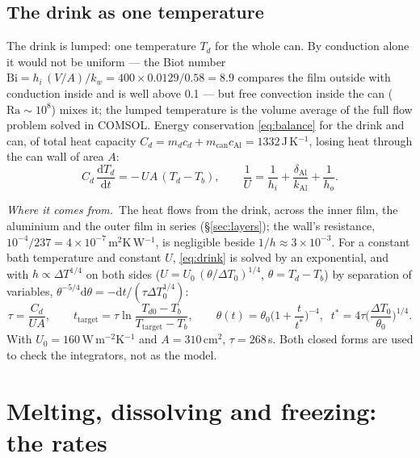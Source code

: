 \documentclass[11pt,a4paper]{article}
\newcommand{\where}{\par\noindent\textit{Where it comes from.}\ }
\begin{document}
\subsection{The drink as one temperature}
\label{sec:lump}
The drink is lumped: one temperature $T_d$ for the whole can. By conduction alone it would not be
uniform — the Biot number $\mathrm{Bi} = h_i\,(V/A)/k_w = 400 \times 0.0129/0.58 = 8.9$ compares the
film outside with conduction inside and is well above 0.1 — but free convection inside the can
($\mathrm{Ra} \sim 10^8$) mixes it; the lumped temperature is the volume average of the full flow
problem solved in COMSOL. Energy conservation \eqref{eq:balance} for the drink and can, of total heat
capacity $C_d = m_d c_d + m_{\text{can}} c_{\text{Al}} = 1332$\,J\,K$^{-1}$, losing heat through the can
wall of area $A$:
\begin{equation}
C_d\,\frac{\mathrm dT_d}{\mathrm dt} = -\,U A\,(T_d - T_b),
\qquad \frac{1}{U} = \frac{1}{h_i} + \frac{\delta_{\text{Al}}}{k_{\text{Al}}} + \frac{1}{h_o} .
\label{eq:drink}
\end{equation}
\where The heat flows from the drink, across the inner film, the aluminium and the outer film in
series (§\ref{sec:layers}); the wall's resistance, $10^{-4}/237 = 4\times10^{-7}$\,m$^2$K\,W$^{-1}$, is
negligible beside $1/h \approx 3\times10^{-3}$. For a constant bath temperature and constant $U$,
\eqref{eq:drink} is solved by an exponential, and with $h \propto \Delta T^{1/4}$ on both sides
($U = U_0\,(\theta/\Delta T_0)^{1/4}$, $\theta = T_d - T_b$) by separation of variables,
$\theta^{-5/4}\mathrm d\theta = -\mathrm dt/(\tau\Delta T_0^{1/4})$:
\begin{equation}
\tau = \frac{C_d}{UA},\qquad
t_{\text{target}} = \tau \ln\frac{T_{d0}-T_b}{T_{\text{target}}-T_b},\qquad
\theta(t) = \theta_0\Big(1+\frac{t}{t^*}\Big)^{-4},\;\;
t^* = 4\tau\Big(\frac{\Delta T_0}{\theta_0}\Big)^{1/4}.
\label{eq:scales}
\end{equation}
With $U_0 = 160$\,W\,m$^{-2}$K$^{-1}$ and $A = 310$\,cm$^2$, $\tau = 268$\,s. Both closed forms are
used to check the integrators, not as the model.

\section{Melting, dissolving and freezing: the rates}
\label{sec:rates}
\end{document}

